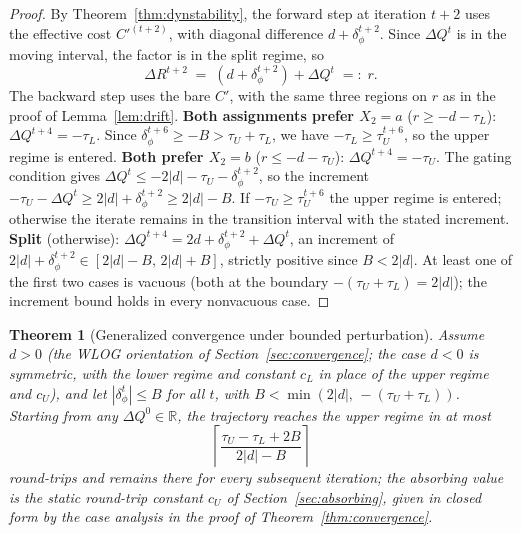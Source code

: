 \documentclass[letterpaper]{article} %
\newtheorem{theorem}{Theorem}[section]
\theoremstyle{definition}
\theoremstyle{remark}
\begin{document}
\begin{proof}
By Theorem~\ref{thm:dynstability}, the forward step at iteration $t+2$ uses the effective cost $C'^{(t+2)}$, with diagonal difference $d + \delta^{t+2}_\phi$.  Since $\Delta Q^t$ is in the moving interval, the factor is in the split regime, so
\[
    \Delta R^{t+2} \;=\; (d+\delta^{t+2}_\phi) + \Delta Q^t \;=:\; r .
\]
The backward step uses the bare $C'$, with the same three regions on $r$ as in the proof of Lemma~\ref{lem:drift}.
\smallskip\noindent\textbf{Both assignments prefer $X_2=a$} ($r \geq -d-\tau_L$): $\Delta Q^{t+4} = -\tau_L$.  Since $\delta^{t+6}_\phi \geq -B > \tau_U+\tau_L$, we have $-\tau_L \geq \tau_U^{t+6}$, so the upper regime is entered.
\smallskip\noindent\textbf{Both prefer $X_2=b$} ($r \leq -d-\tau_U$): $\Delta Q^{t+4} = -\tau_U$.  The gating condition gives $\Delta Q^t \leq -2|d| - \tau_U - \delta^{t+2}_\phi$, so the increment $-\tau_U - \Delta Q^t \geq 2|d| + \delta^{t+2}_\phi \geq 2|d|-B$.  If $-\tau_U \geq \tau_U^{t+6}$ the upper regime is entered; otherwise the iterate remains in the transition interval with the stated increment.
\smallskip\noindent\textbf{Split} (otherwise): $\Delta Q^{t+4} = 2d+\delta^{t+2}_\phi+\Delta Q^t$, an increment of $2|d|+\delta^{t+2}_\phi \in [2|d|-B,\,2|d|+B]$, strictly positive since $B<2|d|$.
\smallskip\noindent At least one of the first two cases is vacuous (both at the boundary $-(\tau_U+\tau_L) = 2|d|$); the increment bound holds in every nonvacuous case. \qedhere
\end{proof}
\begin{theorem}[Generalized convergence under bounded perturbation]\label{thm:dyncvg}
Assume $d > 0$ (the WLOG orientation of Section~\ref{sec:convergence}; the case $d<0$ is symmetric, with the lower regime and constant $c_L$ in place of the upper regime and $c_U$), and let $|\delta^t_\phi| \leq B$ for all $t$, with $B < \min(2|d|,\,-(\tau_U+\tau_L))$.  Starting from any $\Delta Q^0 \in \mathbb{R}$, the trajectory reaches the upper regime in at most
\[
    \left\lceil \frac{\tau_U - \tau_L + 2B}{2|d| - B} \right\rceil
\]
round-trips and remains there for every subsequent iteration; the absorbing value is the static round-trip constant $c_U$ of Section~\ref{sec:absorbing}, given in closed form by the case analysis in the proof of Theorem~\ref{thm:convergence}.
\end{theorem}
\end{document}
